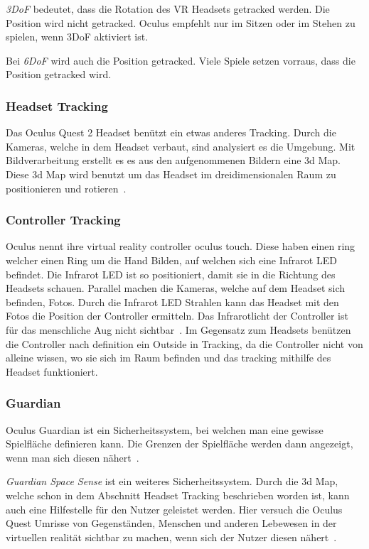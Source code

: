 \emph{3DoF} bedeutet, dass die Rotation des VR Headsets getracked werden.
Die Position wird nicht getracked.
Oculus empfehlt nur im Sitzen oder im Stehen zu spielen, wenn 3DoF aktiviert ist.

Bei \emph{6DoF} wird auch die Position getracked.
Viele Spiele setzen vorraus, dass die Position getracked wird.

\subsubsection{Headset Tracking}

Das Oculus Quest 2 Headset benützt ein etwas anderes Tracking.
Durch die Kameras, welche in dem Headset verbaut, sind analysiert es die Umgebung.
Mit Bildverarbeitung erstellt es es aus den aufgenommenen Bildern eine 3d Map.
Diese 3d Map wird benutzt um das Headset im dreidimensionalen Raum zu positionieren und rotieren~\cite{MECHATECH}.

\subsubsection{Controller Tracking}

Oculus nennt ihre virtual reality controller oculus touch.
Diese haben einen ring welcher einen Ring um die Hand Bilden, auf welchen sich eine Infrarot LED befindet.
Die Infrarot LED ist so positioniert, damit sie in die Richtung des Headsets schauen.
Parallel machen die Kameras, welche auf dem Headset sich befinden, Fotos.
Durch die Infrarot LED Strahlen kann das Headset mit den Fotos die Position der Controller ermitteln.
Das Infrarotlicht der Controller ist für das menschliche Aug nicht sichtbar~\cite{Gajsek_2022}.
Im Gegensatz zum Headsets benützen die Controller nach definition ein Outside in Tracking, da die Controller nicht von alleine wissen, wo sie sich im Raum befinden und das tracking mithilfe des Headset funktioniert.

\subsubsection{Guardian}

Oculus Guardian ist ein Sicherheitssystem, bei welchen man eine gewisse Spielfläche definieren kann.
Die Grenzen der Spielfläche werden dann angezeigt, wenn man sich diesen nähert~\cite{Oculus_Guardien}.

\emph{Guardian Space Sense} ist ein weiteres Sicherheitssystem.
Durch die 3d Map, welche schon in dem Abschnitt Headset Tracking beschrieben worden ist, kann auch eine Hilfestelle für den Nutzer geleistet werden.
Hier versuch die Oculus Quest Umrisse von Gegenständen, Menschen und anderen Lebewesen in der virtuellen realität sichtbar zu machen, wenn sich der Nutzer diesen nähert~\cite{Oculus_Guardien}.

